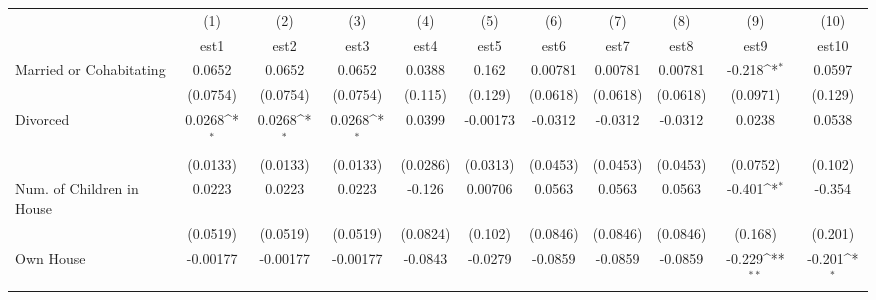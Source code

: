 {
\def\sym#1{\ifmmode^{#1}\else\(^{#1}\)\fi}
\begin{tabular}{l*{10}{c}}
\toprule
            &\multicolumn{1}{c}{(1)}&\multicolumn{1}{c}{(2)}&\multicolumn{1}{c}{(3)}&\multicolumn{1}{c}{(4)}&\multicolumn{1}{c}{(5)}&\multicolumn{1}{c}{(6)}&\multicolumn{1}{c}{(7)}&\multicolumn{1}{c}{(8)}&\multicolumn{1}{c}{(9)}&\multicolumn{1}{c}{(10)}\\
            &\multicolumn{1}{c}{est1}&\multicolumn{1}{c}{est2}&\multicolumn{1}{c}{est3}&\multicolumn{1}{c}{est4}&\multicolumn{1}{c}{est5}&\multicolumn{1}{c}{est6}&\multicolumn{1}{c}{est7}&\multicolumn{1}{c}{est8}&\multicolumn{1}{c}{est9}&\multicolumn{1}{c}{est10}\\
\midrule
Married or Cohabitating&      0.0652         &      0.0652         &      0.0652         &      0.0388         &       0.162         &     0.00781         &     0.00781         &     0.00781         &      -0.218\sym{*}  &      0.0597         \\
            &    (0.0754)         &    (0.0754)         &    (0.0754)         &     (0.115)         &     (0.129)         &    (0.0618)         &    (0.0618)         &    (0.0618)         &    (0.0971)         &     (0.129)         \\
\addlinespace
Divorced    &      0.0268\sym{*}  &      0.0268\sym{*}  &      0.0268\sym{*}  &      0.0399         &    -0.00173         &     -0.0312         &     -0.0312         &     -0.0312         &      0.0238         &      0.0538         \\
            &    (0.0133)         &    (0.0133)         &    (0.0133)         &    (0.0286)         &    (0.0313)         &    (0.0453)         &    (0.0453)         &    (0.0453)         &    (0.0752)         &     (0.102)         \\
\addlinespace
Num. of Children in House&      0.0223         &      0.0223         &      0.0223         &      -0.126         &     0.00706         &      0.0563         &      0.0563         &      0.0563         &      -0.401\sym{*}  &      -0.354         \\
            &    (0.0519)         &    (0.0519)         &    (0.0519)         &    (0.0824)         &     (0.102)         &    (0.0846)         &    (0.0846)         &    (0.0846)         &     (0.168)         &     (0.201)         \\
\addlinespace
Own House   &    -0.00177         &    -0.00177         &    -0.00177         &     -0.0843         &     -0.0279         &     -0.0859         &     -0.0859         &     -0.0859         &      -0.229\sym{**} &      -0.201\sym{*}  \\

\end{tabular}}
